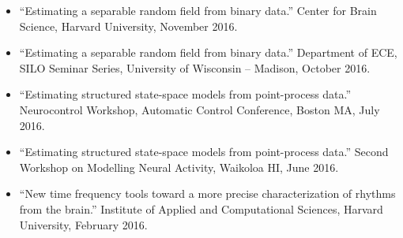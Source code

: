 \begin{itemize}
    \item ``Estimating a separable random field from binary data.'' Center for Brain Science, Harvard University, November 2016.
    \item ``Estimating a separable random field from binary data.'' Department of ECE, SILO Seminar Series, University of Wisconsin -- Madison, October 2016.
   	\item ``Estimating structured state-space models from point-process data.'' Neurocontrol Workshop, Automatic Control Conference, Boston MA, July 2016.
    \item ``Estimating structured state-space models from point-process data.'' Second Workshop on Modelling Neural Activity, Waikoloa HI, June 2016.
    \item ``New time frequency tools toward a more precise characterization of rhythms from the brain.'' Institute of Applied and Computational Sciences, Harvard University, February 2016.

\end{itemize}
